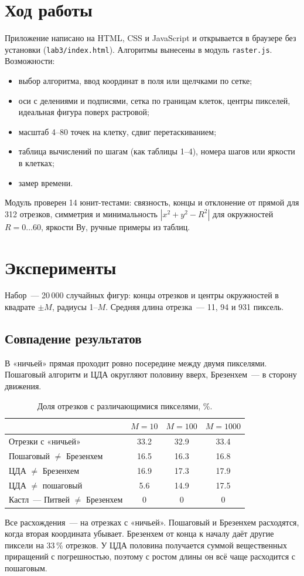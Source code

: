 \documentclass[11pt,a4paper]{article}
\begin{document}
\section{Ход работы}
Приложение написано на HTML, CSS и JavaScript и открывается в браузере без
установки (\texttt{lab3/index.html}). Алгоритмы вынесены в модуль
\texttt{raster.js}. Возможности:
\begin{itemize}[label=--, leftmargin=1.5em, itemsep=0.1em, topsep=0.2em]
  \item выбор алгоритма, ввод координат в поля или щелчками по сетке;
  \item оси с делениями и подписями, сетка по границам клеток, центры пикселей,
        идеальная фигура поверх растровой;
  \item масштаб 4--80 точек на клетку, сдвиг перетаскиванием;
  \item таблица вычислений по шагам (как таблицы 1--4), номера шагов или
        яркости в клетках;
  \item замер времени.
\end{itemize}
Модуль проверен 14 юнит-тестами: связность, концы и отклонение от прямой для
312 отрезков, симметрия и минимальность $|x^2 + y^2 - R^2|$ для окружностей
$R = 0 \dots 60$, яркости Ву, ручные примеры из таблиц.

\section{Эксперименты}
Набор~— 20\,000 случайных фигур: концы отрезков и центры окружностей в
квадрате $\pm M$, радиусы 1--$M$. Средняя длина отрезка~— 11, 94 и 931 пиксель.

\subsection{Совпадение результатов}
В «ничьей» прямая проходит ровно посередине между двумя пикселями. Пошаговый
алгоритм и ЦДА округляют половину вверх, Брезенхем~— в сторону движения.

\begin{table}[H]
\centering\small
\caption{Доля отрезков с различающимися пикселями, \%.}
\begin{tabular}{lccc}
\toprule
 & $M = 10$ & $M = 100$ & $M = 1000$ \\
\midrule
Отрезки с «ничьей»       & 33.2 & 32.9 & 33.4 \\
Пошаговый $\ne$ Брезенхем & 16.5 & 16.3 & 16.8 \\
ЦДА $\ne$ Брезенхем       & 16.9 & 17.3 & 17.9 \\
ЦДА $\ne$ пошаговый       & 5.6  & 14.9 & 17.5 \\
Кастл~— Питвей $\ne$ Брезенхем & 0 & 0 & 0 \\
\bottomrule
\end{tabular}
\end{table}
Все расхождения~— на отрезках с «ничьей». Пошаговый и Брезенхем расходятся,
когда вторая координата убывает. Брезенхем от конца к началу даёт другие
пиксели на 33\,\% отрезков. У ЦДА половина получается суммой вещественных
приращений с погрешностью, поэтому с ростом длины он всё чаще расходится с
пошаговым.
\end{document}
